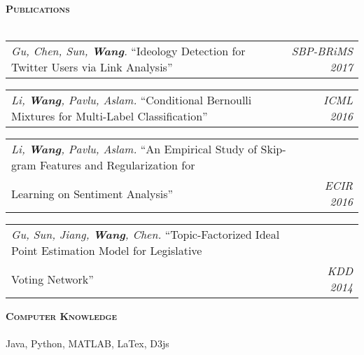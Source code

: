 \documentclass[11pt]{article}
\makeatletter
\newcommand{\lineunder}{\vspace*{-8pt} \\ \hspace*{-18pt} \hrulefill \\}
\newcommand{\header}[1]{{\hspace*{-15pt}\vspace*{6pt} \large \textsc{\textbf{#1}}} \vspace*{-6pt} \lineunder}
\newenvironment{achievements}{\begin{list}{$\bullet$}{\topsep 0pt \itemsep -2pt}}{\vspace*{4pt}\end{list}}
\newcommand{\headerrow}[2]
{\begin{tabular*}{\linewidth}{l@{\extracolsep{\fill}}r}
	\hspace*{-15pt}#1 & #2 \\
\end{tabular*}}
\newcommand{\CPP}
 {C\nolinebreak[4]\hspace{-.05em}\raisebox{.22ex}{\footnotesize\bf ++}}
\makeatother
\begin{document}

  
\vspace*{1.5pt}
\header{Publications}
\headerrow
{\textit{Gu, Chen, Sun, \textbf{Wang}.} ``Ideology Detection for Twitter Users via Link Analysis''}
{\emph{SBP-BRiMS 2017}}

\headerrow
{\textit{Li, \textbf{Wang}, Pavlu, Aslam.} ``Conditional Bernoulli Mixtures for Multi-Label Classification''}
{\emph{ICML 2016}}

\headerrow
{\textit{Li, \textbf{Wang}, Pavlu, Aslam.} ``An Empirical Study of Skip-gram Features and Regularization for \\Learning on Sentiment Analysis''}
{\emph{ECIR 2016}}

\headerrow
{\textit{Gu, Sun, Jiang, \textbf{Wang}, Chen.} ``Topic-Factorized Ideal Point Estimation Model for Legislative \\ Voting Network''}
{\emph{KDD 2014}}


\vspace*{1.5pt}
\header{Computer Knowledge}
Java, Python, MATLAB, LaTex, D3js
\end{document}
